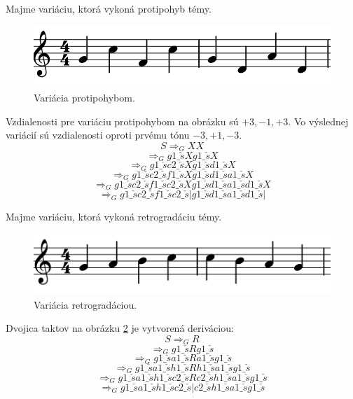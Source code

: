 \begin{example}
Majme variáciu, ktorá vykoná protipohyb témy.
\begin{figure}[H]
    \centering
    \includegraphics[scale=0.4]{thesis/obrazky-figures/contraryvar.png}
    \caption{Variácia protipohybom.}
    \label{fig:potrivar}
    \end{figure}
    Vzdialenosti pre variáciu protipohybom na obrázku sú $+3, -1, +3$. Vo výslednej variácií sú vzdialenosti oproti prvému tónu $-3, +1, -3$.
    $$ S \Rightarrow_G XX $$
    $$ \Rightarrow_G g1\_\check{s}Xg1\_\check{s}X $$
    $$ \Rightarrow_G g1\_\check{s}c2\_\check{s}Xg1\_\check{s}d1\_\check{s}X $$
    $$ \Rightarrow_G g1\_\check{s}c2\_\check{s}f1\_\check{s}Xg1\_\check{s}d1\_\check{s}a1\_\check{s}X $$
    $$ \Rightarrow_G g1\_\check{s}c2\_\check{s}f1\_\check{s}c2\_\check{s}Xg1\_\check{s}d1\_\check{s}a1\_\check{s}d1\_\check{s}X $$
    $$ \Rightarrow_G g1\_\check{s}c2\_\check{s}f1\_\check{s}c2\_\check{s}|g1\_\check{s}d1\_\check{s}a1\_\check{s}d1\_\check{s}| $$
\end{example}

\begin{example}
Majme variáciu, ktorá vykoná retrogradáciu témy.
\begin{figure}[H]
    \centering
    \includegraphics[scale=0.4]{thesis/obrazky-figures/retgradvar.png}
    \caption{Variácia retrogradáciou.}
    \label{fig:retrogradvar}
    \end{figure}
    Dvojica taktov na obrázku \ref{fig:retrogradvar} je vytvorená deriváciou:
    $$ S \Rightarrow_G R $$
    $$ \Rightarrow_G g1\_\check{s}Rg1\_\check{s} $$
    $$ \Rightarrow_G g1\_\check{s}a1\_\check{s}Ra1\_\check{s}g1\_\check{s}$$
    $$ \Rightarrow_G g1\_\check{s}a1\_\check{s}h1\_\check{s}Rh1\_\check{s}a1\_\check{s}g1\_\check{s}$$
    $$ \Rightarrow_G g1\_\check{s}a1\_\check{s}h1\_\check{s}c2\_\check{s}Rc2\_\check{s}h1\_\check{s}a1\_\check{s}g1\_\check{s}$$
    $$ \Rightarrow_G g1\_\check{s}a1\_\check{s}h1\_\check{s}c2\_\check{s}|c2\_\check{s}h1\_\check{s}a1\_\check{s}g1\_\check{s}$$
\end{example}

